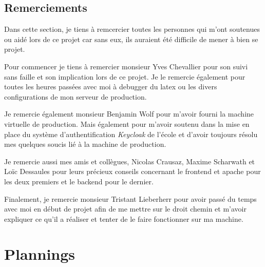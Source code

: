 \documentclass[
    iai, %
    il, %
]{heig-tb}
\begin{document}
\section{Remerciements}
Dans cette section, je tiens à remcercier toutes les personnes qui m'ont soutenues ou aidé lors de ce projet car sans eux, ils auraient été difficile de mener à bien se projet.

Pour commencer je tiens à remercier monsieur Yves Chevallier pour son suivi sans faille et son implication lors de ce projet. Je le remercie également pour toutes les heures passées avec moi à debugger du \Gls{latex} ou les divers configurations de mon serveur de production.

Je remercie également monsieur Benjamin Wolf pour m'avoir fourni la machine virtuelle de production. Mais également pour m'avoir soutenu dans la mise en place du système d'authentification \emph{Keycloak} de l'école et d'avoir toujours résolu mes quelques soucis lié à la machine de production.

Je remercie aussi mes amis et collègues, Nicolas Crausaz, Maxime Scharwath et Loïc Dessaules pour leurs précieux conseils concernant le \Gls{frontend} et \Gls{apache} pour les deux premiers et le \Gls{backend} pour le dernier.

Finalement, je remercie monsieur Tristant Lieberherr pour avoir passé du temps avec moi en début de projet afin de me mettre sur le droit chemin et m'avoir expliquer ce qu'il a réaliser et tenter de le faire fonctionner sur ma machine.

\vfil
\hspace{8cm}\makeatletter\@author\makeatother\par
\hspace{8cm}\begin{minipage}{5cm}
    \printsignature
\end{minipage}
\clearpage

\appendix
\appendixpage
\addappheadtotoc

\chapter{Plannings}

\begin{landscape}
    
\end{landscape}

\begin{landscape}
    
\end{landscape}
\end{document}
